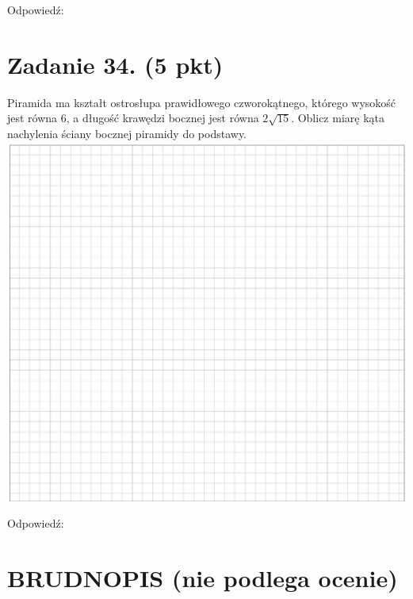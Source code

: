\documentclass[10pt]{article}
\begin{document}
Odpowiedź: \(\qquad\)

\section*{Zadanie 34. (5 pkt)}
Piramida ma kształt ostrosłupa prawidłowego czworokątnego, którego wysokość jest równa 6, a długość krawędzi bocznej jest równa \(2 \sqrt{15}\). Oblicz miarę kąta nachylenia ściany bocznej piramidy do podstawy.\\
\includegraphics[max width=\textwidth, center]{2024_11_21_3a102e13f4b06a61f46fg-14}

Odpowiedź: \(\qquad\)

\section*{BRUDNOPIS (nie podlega ocenie)}
\end{document}
